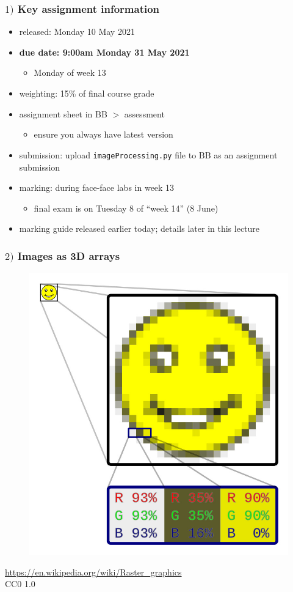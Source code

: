 \documentclass[english,14pt]{beamer}
\begin{document}
\begin{frame}[fragile]

\frametitle{$1)$ Key assignment information}

\begin{itemize}
	\item released: Monday 10 May 2021
	\item \textbf{due date: 9:00am Monday 31 May 2021}
	\begin{itemize}
		\item Monday of week 13
	\end{itemize}
	\item weighting: 15\% of final course grade
	\item assignment sheet in BB $>$ assessment
	\begin{itemize}
		\item ensure you always have latest version
	\end{itemize}
	\item submission: upload \texttt{imageProcessing.py} file to BB as an assignment submission
	\item marking: during face-face labs in week 13
	\begin{itemize}
		\item final exam is on Tuesday 8 of ``week 14'' (8 June)
	\end{itemize}
	\item marking guide released earlier today; details later in this lecture	
\end{itemize}

\end{frame}


\begin{frame}[fragile]

\frametitle{$2)$ Images as 3D arrays}
\vspace*{-5mm}
\begin{figure}[ht]
	\centering
	\includegraphics[width=.5\textwidth]{figures/smiley}
\end{figure}
\vspace*{-5mm}
{\footnotesize
\href{https://en.wikipedia.org/wiki/Raster_graphics}{https://en.wikipedia.org/wiki/Raster\_graphics} \\
\vspace*{-1mm}
CC0 1.0}

\end{frame}
\end{document}
